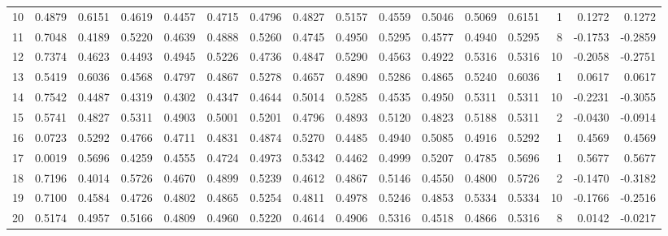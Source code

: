\begin{tabular}{lrrrrrrrrrrrrrrr}
10  &      0.4879 &  0.6151 &  0.4619 &  0.4457 &  0.4715 &  0.4796 &  0.4827 &  0.5157 &  0.4559 &  0.5046 &   0.5069 &     0.6151 &      1 &                    0.1272 &                     0.1272 \\
11  &      0.7048 &  0.4189 &  0.5220 &  0.4639 &  0.4888 &  0.5260 &  0.4745 &  0.4950 &  0.5295 &  0.4577 &   0.4940 &     0.5295 &      8 &                   -0.1753 &                    -0.2859 \\
12  &      0.7374 &  0.4623 &  0.4493 &  0.4945 &  0.5226 &  0.4736 &  0.4847 &  0.5290 &  0.4563 &  0.4922 &   0.5316 &     0.5316 &     10 &                   -0.2058 &                    -0.2751 \\
13  &      0.5419 &  0.6036 &  0.4568 &  0.4797 &  0.4867 &  0.5278 &  0.4657 &  0.4890 &  0.5286 &  0.4865 &   0.5240 &     0.6036 &      1 &                    0.0617 &                     0.0617 \\
14  &      0.7542 &  0.4487 &  0.4319 &  0.4302 &  0.4347 &  0.4644 &  0.5014 &  0.5285 &  0.4535 &  0.4950 &   0.5311 &     0.5311 &     10 &                   -0.2231 &                    -0.3055 \\
15  &      0.5741 &  0.4827 &  0.5311 &  0.4903 &  0.5001 &  0.5201 &  0.4796 &  0.4893 &  0.5120 &  0.4823 &   0.5188 &     0.5311 &      2 &                   -0.0430 &                    -0.0914 \\
16  &      0.0723 &  0.5292 &  0.4766 &  0.4711 &  0.4831 &  0.4874 &  0.5270 &  0.4485 &  0.4940 &  0.5085 &   0.4916 &     0.5292 &      1 &                    0.4569 &                     0.4569 \\
17  &      0.0019 &  0.5696 &  0.4259 &  0.4555 &  0.4724 &  0.4973 &  0.5342 &  0.4462 &  0.4999 &  0.5207 &   0.4785 &     0.5696 &      1 &                    0.5677 &                     0.5677 \\
18  &      0.7196 &  0.4014 &  0.5726 &  0.4670 &  0.4899 &  0.5239 &  0.4612 &  0.4867 &  0.5146 &  0.4550 &   0.4800 &     0.5726 &      2 &                   -0.1470 &                    -0.3182 \\
19  &      0.7100 &  0.4584 &  0.4726 &  0.4802 &  0.4865 &  0.5254 &  0.4811 &  0.4978 &  0.5246 &  0.4853 &   0.5334 &     0.5334 &     10 &                   -0.1766 &                    -0.2516 \\
20  &      0.5174 &  0.4957 &  0.5166 &  0.4809 &  0.4960 &  0.5220 &  0.4614 &  0.4906 &  0.5316 &  0.4518 &   0.4866 &     0.5316 &      8 &                    0.0142 &                    -0.0217 \\

\end{tabular}
